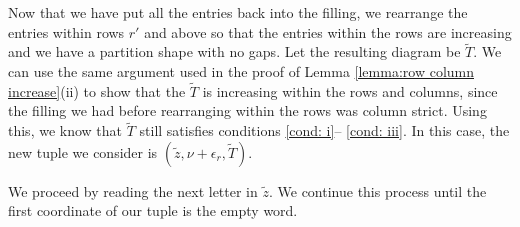 \documentclass[10pt]{amsart}
\theoremstyle{plain}
\theoremstyle{definition}
\theoremstyle{plain}
\theoremstyle{plain}
\theoremstyle{remark}
\theoremstyle{plain}
\theoremstyle{plain}
\begin{document}
\begin{alg}
    
Now that we have put all the entries back into the filling, we rearrange the entries within rows $r'$ and above so that the entries within the rows are increasing and we have a partition shape with no gaps.
Let the resulting diagram be $\tilde{T}$. We can use the same argument used in the proof of Lemma \ref{lemma:row column increase}(ii) to show that the $\tilde{T}$ is increasing within the rows and columns, since the filling we had before rearranging within the rows was column strict. Using this, we know that $\tilde{T}$ still satisfies conditions \ref{cond: i}-- \ref{cond: iii}.
In this case, the new tuple we consider is $(\tilde{z},\nu+\epsilon_{r}, \tilde{T})$.

We proceed by reading the next letter in $\tilde{z}$. We continue this process until the first coordinate of our tuple is the empty word.
    \end{alg}
\end{document}
